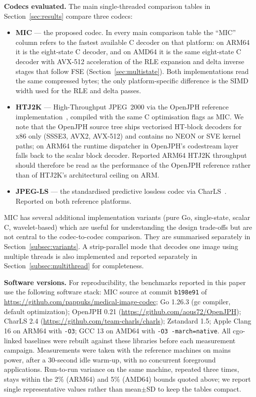 \documentclass[journal]{IEEEtran}
\begin{document}
\textbf{Codecs evaluated.} The main single-threaded comparison tables in
Section~\ref{sec:results} compare three codecs:

\begin{itemize}
  \item \textbf{MIC} --- the proposed codec. In every main comparison table the
  ``MIC'' column refers to the fastest available C decoder on that
  platform: on ARM64 it is the eight-state C decoder, and on AMD64 it is
  the same eight-state C decoder with AVX-512 acceleration of the RLE
  expansion and delta inverse stages that follow FSE
  (Section~\ref{sec:multistate}). Both implementations read the same
  compressed bytes; the only platform-specific difference is the SIMD
  width used for the RLE and delta passes.
  \item \textbf{HTJ2K} --- High-Throughput JPEG~2000 via the OpenJPH
  reference implementation~\cite{openjph}, compiled with the same C
  optimisation flags as MIC. We note that the OpenJPH source tree ships
  vectorised HT-block decoders for x86 only (SSSE3, AVX2, AVX-512) and
  contains no NEON or SVE kernel paths; on ARM64 the runtime dispatcher
  in OpenJPH's codestream layer falls back to the scalar block decoder.
  Reported ARM64 HTJ2K throughput should therefore be read as the
  performance of the OpenJPH reference rather than of HTJ2K's
  architectural ceiling on ARM.
  \item \textbf{JPEG-LS} --- the standardised predictive lossless codec
  via CharLS~\cite{charls}. Reported on both reference platforms.
\end{itemize}

MIC has several additional implementation variants (pure Go, single-state,
scalar C, wavelet-based) which are useful for understanding the design
trade-offs but are not central to the codec-to-codec comparison. They are
summarised separately in Section~\ref{subsec:variants}. A strip-parallel
mode that decodes one image using multiple threads is also implemented and
reported separately in Section~\ref{subsec:multithread} for completeness.

\textbf{Software versions.} For reproducibility, the benchmarks reported
in this paper use the following software stack: MIC source at commit
\texttt{b198e91} of \url{https://github.com/pappuks/medical-image-codec};
Go 1.26.3 (gc compiler, default optimization); OpenJPH 0.21
(\url{https://github.com/aous72/OpenJPH}); CharLS 2.4
(\url{https://github.com/team-charls/charls}); Zstandard 1.5; Apple Clang
16 on ARM64 with \texttt{-O3}; GCC 13 on AMD64 with
\texttt{-O3 -march=native}. All cgo-linked baselines were rebuilt against
these libraries before each measurement campaign. Measurements were taken
with the reference machines on mains power, after a 30-second idle
warm-up, with no concurrent foreground applications. Run-to-run variance
on the same machine, repeated three times, stays within the 2\% (ARM64)
and 5\% (AMD64) bounds quoted above; we report single representative
values rather than mean$\pm$SD to keep the tables compact.
\end{document}
